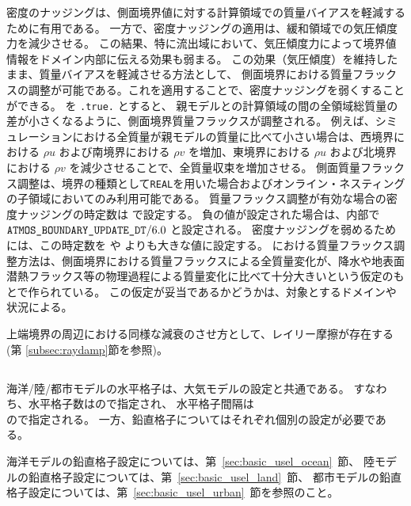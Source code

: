 密度のナッジングは、側面境界値に対する計算領域での質量バイアスを軽減するために有用である。
一方で、密度ナッジングの適用は、緩和領域での気圧傾度力を減少させる。
この結果、特に流出域において、気圧傾度力によって境界値情報をドメイン内部に伝える効果も弱まる。
この効果（気圧傾度）を維持したまま、質量バイアスを軽減させる方法として、
側面境界における質量フラックスの調整が可能である。これを適用することで、密度ナッジングを弱くすることができる。
%
 を \verb|.true.| とすると、
親モデルと\scale の計算領域の間の全領域総質量の差が小さくなるように、側面境界質量フラックスが調整される。
例えば、シミュレーションにおける全質量が親モデルの質量に比べて小さい場合は、西境界における $\rho u$ および南境界における $\rho v$ を増加、東境界における $\rho u$ および北境界における $\rho v$ を減少させることで、全質量収束を増加させる。
側面質量フラックス調整は、境界の種類として\verb|REAL|を用いた場合およびオンライン・ネスティングの子領域においてのみ利用可能である。
質量フラックス調整が有効な場合の密度ナッジングの時定数は  で設定する。
負の値が設定された場合は、内部で $\nmitemeq{ATMOS_BOUNDARY_UPDATE_DT} / 6.0$ と設定される。
密度ナッジングを弱めるためには、この時定数を  や  よりも大きな値に設定する。
\scalerm における質量フラックス調整方法は、側面境界における質量フラックスによる全質量変化が、降水や地表面潜熱フラックス等の物理過程による質量変化に比べて十分大きいという仮定のもとで作られている。
この仮定が妥当であるかどうかは、対象とするドメインや状況による。


上端境界の周辺における同様な減衰のさせ方として、レイリー摩擦が存在する(第 \ref{subsec:raydamp}節を参照)。

\subsection{\SubsecGridOceanLandUrban} \label{subsec:gridolu}

海洋/陸/都市モデルの水平格子は、大気モデルの設定と共通である。
すなわち、水平格子数はので指定され、
水平格子間隔は \\ ので指定される。
一方、鉛直格子についてはそれぞれ個別の設定が必要である。

海洋モデルの鉛直格子設定については、第~\ref{sec:basic_usel_ocean}~節、
陸モデルの鉛直格子設定については、第~\ref{sec:basic_usel_land}~節、
都市モデルの鉛直格子設定については、第~\ref{sec:basic_usel_urban}~節を参照のこと。


